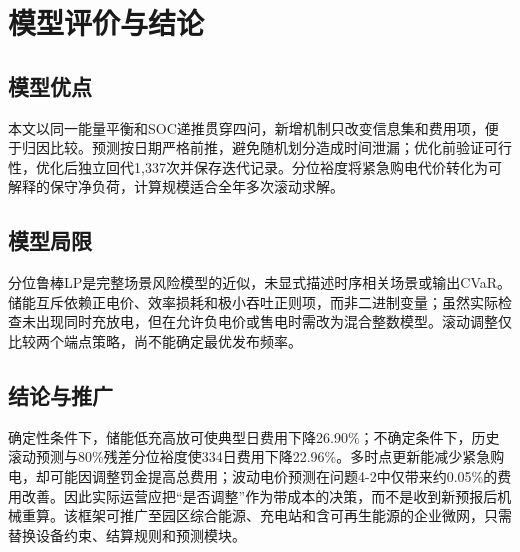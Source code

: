 \section{模型评价与结论}
\subsection{模型优点}
本文以同一能量平衡和SOC递推贯穿四问，新增机制只改变信息集和费用项，便于归因比较。预测按日期严格前推，避免随机划分造成时间泄漏；优化前验证可行性，优化后独立回代1,337次并保存迭代记录。分位裕度将紧急购电代价转化为可解释的保守净负荷，计算规模适合全年多次滚动求解。
\subsection{模型局限}
分位鲁棒LP是完整场景风险模型的近似，未显式描述时序相关场景或输出CVaR。储能互斥依赖正电价、效率损耗和极小吞吐正则项，而非二进制变量；虽然实际检查未出现同时充放电，但在允许负电价或售电时需改为混合整数模型。滚动调整仅比较两个端点策略，尚不能确定最优发布频率。
\subsection{结论与推广}
确定性条件下，储能低充高放可使典型日费用下降26.90\%；不确定条件下，历史滚动预测与80\%残差分位裕度使334日费用下降22.96\%。多时点更新能减少紧急购电，却可能因调整罚金提高总费用；波动电价预测在问题4-2中仅带来约0.05\%的费用改善。因此实际运营应把“是否调整”作为带成本的决策，而不是收到新预报后机械重算。该框架可推广至园区综合能源、充电站和含可再生能源的企业微网，只需替换设备约束、结算规则和预测模块。
